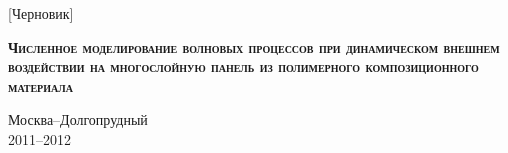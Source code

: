 \begin{titlepage}
\newpage

\begin{center}
\end{center}

\vspace{2em}

\begin{center}
[Черновик]
\end{center}

\vspace{5em}

\begin{center}
\textsc{\textbf{Численное моделирование волновых процессов при динамическом внешнем воздействии на многослойную панель из полимерного композиционного материала}}
\end{center}

\vspace{\fill}
\begin{center}
Москва--Долгопрудный\\
2011--2012
\end{center}

\end{titlepage}
